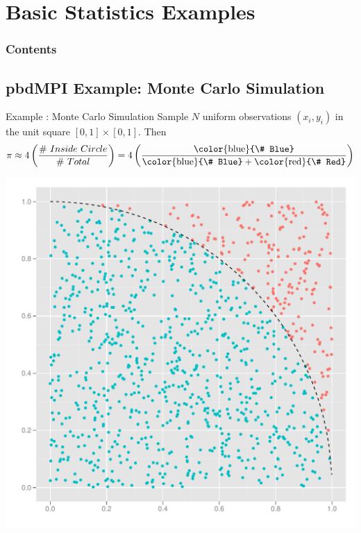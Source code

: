 




\section[Stats eg's]{Basic Statistics Examples}

\hidenum
\begin{frame}[noframenumbering]
\frametitle{Contents}
 \tableofcontents[currentsection,hideothersubsections,sectionstyle=show/hide]
\end{frame}
\shownum


\subsection{pbdMPI Example: Monte Carlo Simulation}

\begin{frame}[shrink]
  \begin{block}{Example \countex :  Monte Carlo Simulation}\pause
  Sample $N$ uniform observations $(x_i, y_i)$ in the unit square $[0, 1]\times [0,1]$.  Then
\begin{equation*}
\pi \approx 4\left(\frac{\#\ Inside\ Circle}{\#\ Total}\right) = 4\left(\frac{\text{\color{blue}{\# Blue}}}{\text{\color{blue}{\# Blue}}+\text{\color{red}{\# Red}}}\right)
\label{eqn:pi}
\end{equation*}
  \begin{center}
   \includegraphics[scale=.25]{pics/pi} 
  \end{center}
  \end{block}
\end{frame}


